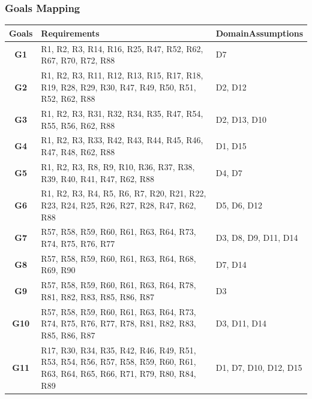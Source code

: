 \documentclass{Configuration_Files/PoliMi3i_thesis}
\begin{document}
\subsubsection{Goals Mapping}

\begin{table}[H]
    \begin{xltabular}{\textwidth}{| >{}c|X|X|}
    \hline
    \textbf{Goals}&\textbf{Requirements}&\textbf{DomainAssumptions}\T\B\\
    \hline
    \textbf{G1}
    & %
    R1, R2, R3, R14, R16, R25, R47, R52, R62, R67, R70, R72, R88
    & %
    D7\T\B\\
    \hline
    \textbf{G2}
    & %
    R1, R2, R3, R11, R12, R13, R15, R17, R18, R19, R28, R29, R30, R47, R49, R50, R51, R52, R62, R88
    & %
    D2, D12\T\B\\
    \hline
    \textbf{G3}
    & %
    R1, R2, R3, R31, R32, R34, R35, R47, R54, R55, R56, R62, R88
    & %
    D2, D13, D10 \T\B\\
    \hline
    \textbf{G4}
    & %
    R1, R2, R3, R33, R42, R43, R44, R45, R46, R47, R48, R62, R88
    & %
    D1, D15 \T\B\\
    \hline
    \textbf{G5}
    & %
    R1, R2, R3, R8, R9, R10, R36, R37, R38, R39, R40, R41, R47, R62, R88
    & %
    D4, D7\T\B\\
    \hline
    \textbf{G6}
    & %
    R1, R2, R3, R4, R5, R6, R7, R20, R21, R22, R23, R24, R25, R26, R27, R28, R47, R62, R88
    & %
    D5, D6, D12\T\B\\
    \hline
    \textbf{G7}
    & %
    R57, R58, R59, R60, R61, R63, R64, R73, R74, R75, R76, R77
    & %
    D3, D8, D9, D11, D14\T\B\\
    \hline
    \textbf{G8}
    & %
    R57, R58, R59, R60, R61, R63, R64, R68, R69, R90
    & %
    D7, D14 \T\B\\
    \hline
    \textbf{G9}
    & %
    R57, R58, R59, R60, R61, R63, R64, R78, R81, R82, R83, R85, R86, R87
    & %
    D3 \T\B\\
    \hline
    \textbf{G10}
    & %
    R57, R58, R59, R60, R61, R63, R64, R73, R74, R75, R76, R77, R78, R81, R82, R83, R85, R86, R87
    & %
    D3, D11, D14 \T\B\\
    \hline
    \textbf{G11}
    & %
    R17, R30, R34, R35, R42, R46, R49, R51, R53, R54, R56, R57, R58, R59, R60, R61, R63, R64, R65, R66, R71, R79, R80, R84, R89
    & %
    D1, D7, D10, D12, D15 \T\B\\
    \hline
    \end{xltabular}
\end{table}
\end{document}
